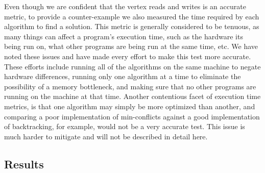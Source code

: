 \documentclass{article}
\begin{document}
	Even though we are confident that the vertex reads and writes is an accurate metric, to provide a counter-example we also measured the time required by each algorithm to find a solution. This metric is generally considered to be tenuous, as many things can affect a program's execution time, such as the hardware its being run on, what other programs are being run at the same time, etc. We have noted these issues and have made every effort to make this test more accurate. These efforts include running all of the algorithms on the same machine to negate hardware differences, running only one algorithm at a time to eliminate the possibility of a memory bottleneck, and making sure that no other programs are running on the machine at that time. Another contentious facet of execution time metrics, is that one algorithm may simply be more optimized than another, and comparing a poor implementation of min-conflicts against a good implementation of backtracking, for example, would not be a very accurate test. This issue is much harder to mitigate and will not be described in detail here.
	\subsection{Results}
	
\end{document}
